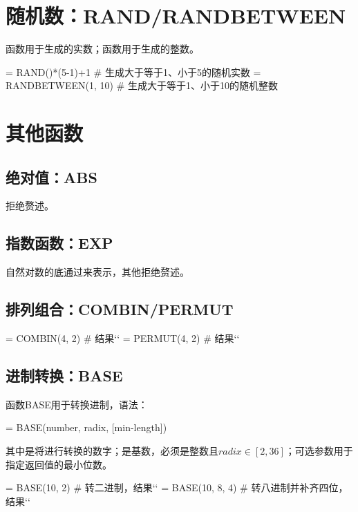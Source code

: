 \section{随机数：RAND/RANDBETWEEN}
函数用于生成的实数；函数用于生成的整数。
\begin{excode}
= RAND()*(5-1)+1  # 生成大于等于1、小于5的随机实数
= RANDBETWEEN(1, 10)  # 生成大于等于1、小于10的随机整数
\end{excode}

\section{其他函数}
\subsection{绝对值：ABS}
拒绝赘述。

\subsection{指数函数：EXP}
自然对数的底通过来表示，其他拒绝赘述。

\subsection{排列组合：COMBIN/PERMUT}
\begin{excode}
= COMBIN(4, 2)  # 结果``
= PERMUT(4, 2)  # 结果``
\end{excode}

\subsection{进制转换：BASE}
函数BASE用于转换进制，语法：
\begin{syntax}
= BASE(number, radix, [min-length])
\end{syntax}

其中是将进行转换的数字；是基数，必须是整数且$radix\in [2, 36]$；可选参数用于指定返回值的最小位数。

\begin{excode}
= BASE(10, 2)  # 转二进制，结果``
= BASE(10, 8, 4)  # 转八进制并补齐四位，结果``
\end{excode}

